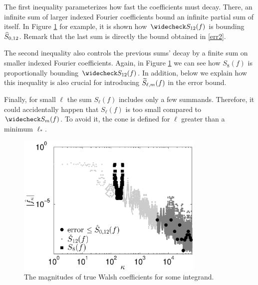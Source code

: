 \documentclass[graybox]{svmult}
\begin{document}
The first inequality parameterizes how fast the coefficients must decay. There, an infinite sum of larger indexed Fourier coefficients bound an infinite partial sum of itself. In Figure \ref{Walshcoeffig} for example, it is shown how $\wcS_{12}(f)$ is bounding $\widehat{S}_{0,12}$. Remark that the last sum is directly the bound obtained in \eqref{err2}.

The second inequality also controls the previous sums' decay by a finite sum on smaller indexed Fourier coefficients. Again, in Figure \ref{Walshcoeffig} we can see how $S_8(f)$ is proportionally bounding $\wcS_{12}(f)$. In addition, below we explain how this inequality is also crucial for introducing $\widetilde{S}_{\ell,m}(f)$ in the error bound.

Finally, for small $\ell$ the sum $S_\ell(f)$ includes only a few summands. Therefore, it could accidentally happen that $S_\ell(f)$ is too small compared to $\wcS_m(f)$. To avoid it, the cone is defined for $\ell$ greater than a minimum $\ell_*$.
\begin{figure}
\centering
\includegraphics[width=9cm]{Images/PlotFFTCoefUse256.eps}
\caption{The magnitudes of true Walsh coefficients for some integrand. \label{Walshcoeffig}}
\end{figure}
\end{document}
